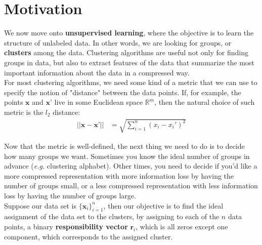 \documentclass[12pt,letterpaper]{article}
\begin{document}




\section{Motivation}
We now move onto \textbf{unsupervised learning}, where the objective is to learn the structure of unlabeled data. In other words, we are looking for groups, or \textbf{clusters} among the data. Clustering algorithms are useful not only for finding groups in data, but also to extract features of the data that summarize the most important information about the data in a compressed way. \\
For most clustering algorithms, we need some kind of a metric that we can use to specify the notion of "distance" between the data points. If, for example, the points $\textbf{x}$ and $\textbf{x'}$ live in some Euclidean space $\mathbb{R}^m$, then the natural choice of such metric is the $l_2$ distance:
\begin{align*}
	 ||\textbf{x} - \textbf{x'}|| &= \sqrt{\sum_{i = 1}^{n}(x_i - x_i')^2}
\end{align*}

Now that the metric is well-defined, the next thing we need to do is to decide how many groups we want. Sometimes you know the ideal number of groups in advance (\textit{e.g.} clustering alphabet). Other times, you need to decide if you'd like a more compressed representation with more information loss by having the number of groups small, or a less compressed representation with less information loss by having the number of groups large. \\
Suppose our data set is $\{\textbf{x}_i\}_{i=1}^{n}$, then our objective is to find the ideal assignment of the data set to the clusters, by assigning to each of the $n$ data points, a binary \textbf{responsibility vector} $\textbf{r}_i$, which is all zeros except one component, which corresponds to the assigned cluster.
\end{document}
